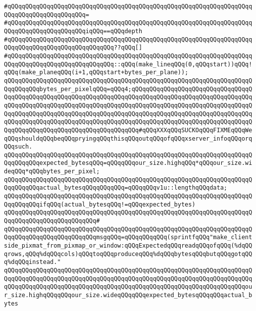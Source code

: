 \verb|#qQQqqQQqqQQqqQQqqQQqqQQqqQQqqQQqqQQqqQQqqQQqqQQqqQQqqQQqqQQqqQQqqQQqqQQqqQQqqQQqqQQqqQQqqQQq=|\newline
\verb|#qQQqqQQqqQQqqQQqqQQqqQQqqQQqqQQqqQQqqQQqqQQqqQQqqQQqqQQqqQQqqQQqqQQqqQQqqQQqqQQqqQQqqQQqqQQqiqQQq==qQQqdepth|\newline
\verb|#qQQqqQQqqQQqqQQqqQQqqQQqqQQqqQQqqQQqqQQqqQQqqQQqqQQqqQQqqQQqqQQqqQQqqQQqqQQqqQQqqQQqqQQqqQQqqQQqqQQq??qQQq[]|\newline
\verb|#qQQqqQQqqQQqqQQqqQQqqQQqqQQqqQQqqQQqqQQqqQQqqQQqqQQqqQQqqQQqqQQqqQQqqQQqqQQqqQQqqQQqqQQqqQQqqQQqqQQq::qQQq(make_lineqQQq(0,qQQqstart))qQQq!qQQq(make_planeqQQq(i+1,qQQqstart+bytes_per_plane));|\newline
\newline
\newline
\verb|qQQqqQQqqQQqqQQqqQQqqQQqqQQqqQQqqQQqqQQqqQQqqQQqqQQqqQQqqQQqqQQqqQQqqQQqqQQqqQQqbytes_per_pixelqQQq=qQQq4;qQQqqQQqqQQqqQQqqQQqqQQqqQQqqQQqqQQqqQQqqQQqqQQqqQQqqQQqqQQqqQQqqQQqqQQqqQQqqQQqqQQqqQQqqQQqqQQqqQQqqQQqqQQqqQQqqQQqqQQqqQQqqQQqqQQqqQQqqQQqqQQqqQQqqQQqqQQqqQQqqQQqqQQqqQQqqQQqqQQqqQQqqQQqqQQqqQQqqQQqqQQqqQQqqQQqqQQqqQQqqQQqqQQqqQQqqQQqqQQqqQQqqQQqqQQqqQQqqQQqqQQqqQQqqQQqqQQqqQQqqQQqqQQqqQQqqQQqqQQqqQQqqQQqqQQqqQQqqQQqqQQqqQQqqQQqqQQqqQQqqQQqqQQqqQQq#qQQqXXXqQQqSUCKOqQQqFIXMEqQQqWeqQQqshouldqQQqbeqQQqpryingqQQqthisqQQqoutqQQqofqQQqxserver_infoqQQqorqQQqsuch.|\newline
\newline
\verb|qQQqqQQqqQQqqQQqqQQqqQQqqQQqqQQqqQQqqQQqqQQqqQQqqQQqqQQqqQQqqQQqqQQqqQQqqQQqqQQqexpected_bytesqQQq=qQQqqQQqour_size.highqQQq*qQQqour_size.wideqQQq*qQQqbytes_per_pixel;|\newline
\verb|qQQqqQQqqQQqqQQqqQQqqQQqqQQqqQQqqQQqqQQqqQQqqQQqqQQqqQQqqQQqqQQqqQQqqQQqqQQqqQQqactual_bytesqQQqqQQqqQQq=qQQqqQQqv1u::lengthqQQqdata;|\newline
\verb|qQQqqQQqqQQqqQQqqQQqqQQqqQQqqQQqqQQqqQQqqQQqqQQqqQQqqQQqqQQqqQQqqQQqqQQqqQQqqQQqifqQQq(actual_bytesqQQq!=qQQqexpected_bytes)|\newline
\verb|qQQqqQQqqQQqqQQqqQQqqQQqqQQqqQQqqQQqqQQqqQQqqQQqqQQqqQQqqQQqqQQqqQQqqQQqqQQqqQQqqQQqqQQqqQQqqQQq#|\newline
\verb|qQQqqQQqqQQqqQQqqQQqqQQqqQQqqQQqqQQqqQQqqQQqqQQqqQQqqQQqqQQqqQQqqQQqqQQqqQQqqQQqqQQqqQQqqQQqqQQqmsgqQQq=qQQqqQQqqQQq(sprintfqQQq"make_clientside_pixmat_from_pixmap_or_window:qQQqExpectedqQQqreadqQQqofqQQq(%dqQQqrows,qQQq%dqQQqcols)qQQqtoqQQqproduceqQQq%dqQQqbytesqQQqbutqQQqgotqQQq%dqQQqinstead."|\newline
\verb|qQQqqQQqqQQqqQQqqQQqqQQqqQQqqQQqqQQqqQQqqQQqqQQqqQQqqQQqqQQqqQQqqQQqqQQqqQQqqQQqqQQqqQQqqQQqqQQqqQQqqQQqqQQqqQQqqQQqqQQqqQQqqQQqqQQqqQQqqQQqqQQqqQQqqQQqqQQqqQQqqQQqqQQqqQQqqQQqqQQqqQQqqQQqqQQqqQQqqQQqqQQqqQQqour_size.highqQQqqQQqour_size.wideqQQqqQQqexpected_bytesqQQqqQQqactual_bytes|\newline
